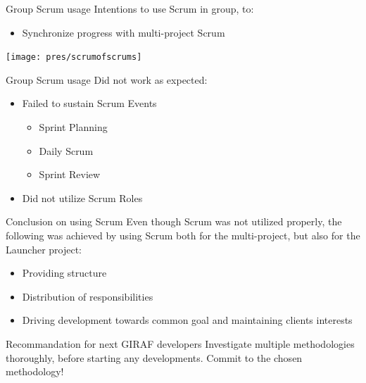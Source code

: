 \begin{frame}{Group Scrum usage}
	Intentions to use Scrum in group, to:
	\begin{itemize}
		\item Synchronize progress with multi-project Scrum
	\end{itemize}
	\begin{center}
	\texttt{[image: pres/scrumofscrums]}
	\end{center}
\end{frame}

\begin{frame}{Group Scrum usage}
  Did not work as expected:
  \pause
  \begin{itemize}
    	\item Failed to sustain Scrum Events
    			\begin{itemize}
    			\item Sprint Planning
    			\item Daily Scrum
    			\item Sprint Review
    			\end{itemize}
    			\pause
    \item Did not utilize Scrum Roles
  \end{itemize}
\end{frame}

\begin{frame}{Conclusion on using Scrum}
  Even though Scrum was not utilized properly, the following was achieved by using Scrum both for the multi-project, but also for the Launcher project:
  \pause
  \begin{itemize}
    \item Providing structure
    \pause
    \item Distribution of responsibilities
    \pause
    \item Driving development towards common goal and maintaining clients interests
  \end{itemize}
  \pause
  \linespace
  \begin{block}{Recommandation for next GIRAF developers}
  Investigate multiple methodologies thoroughly, before starting any developments.
  Commit to the chosen methodology!
  \end{block}
\end{frame}

